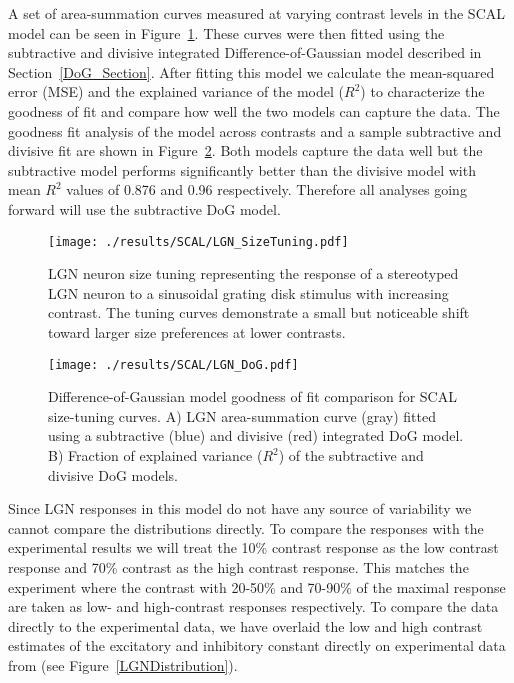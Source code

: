 A set of area-summation curves measured at varying contrast levels in
the SCAL model can be seen in Figure~\ref{LGNSizeTuning}. These curves
were then fitted using the subtractive and divisive integrated
Difference-of-Gaussian model described in Section~\ref{DoG_Section}.
After fitting this model we calculate the mean-squared error (MSE) and
the explained variance of the model ($R^2$) to characterize the
goodness of fit and compare how well the two models can capture the
data. The goodness fit analysis of the model across contrasts and a
sample subtractive and divisive fit are shown in
Figure~\ref{LGNSizeFit}. Both models capture the data well but the
subtractive model performs significantly better than the divisive
model with mean $R^2$ values of 0.876 and 0.96 respectively. Therefore
all analyses going forward will use the subtractive DoG model.

\begin{figure}
	\centering
    \texttt{[image: ./results/SCAL/LGN\_SizeTuning.pdf]}
	\caption[SCAL model size-tuning curves]{LGN neuron size tuning
      representing the response of a stereotyped LGN neuron to a
      sinusoidal grating disk stimulus with increasing contrast. The
      tuning curves demonstrate a small but noticeable shift toward
      larger size preferences at lower contrasts.}
	\label{LGNSizeTuning}
\end{figure}

\begin{figure}
	\centering
        \texttt{[image: ./results/SCAL/LGN\_DoG.pdf]}
	    \caption[SCAL model size-tuning DoG
          fit.]{Difference-of-Gaussian model goodness of fit
          comparison for SCAL size-tuning curves. A) LGN
          area-summation curve (gray) fitted using a subtractive
          (blue) and divisive (red) integrated DoG model. B) Fraction
          of explained variance ($R^2$) of the subtractive and
          divisive DoG models.}
	\label{LGNSizeFit}
\end{figure}

Since LGN responses in this model do not have any source of
variability we cannot compare the distributions directly. To compare
the responses with the experimental results we will treat the 10\%
contrast response as the low contrast response and 70\% contrast as
the high contrast response. This matches the experiment where the
contrast with 20-50\% and 70-90\% of the maximal response are taken as
low- and high-contrast responses respectively. To compare the data
directly to the experimental data, we have overlaid the low and high
contrast estimates of the excitatory and inhibitory constant directly
on experimental data from \cite{Sceniak2006} (see
Figure~\ref{LGNDistribution}).

